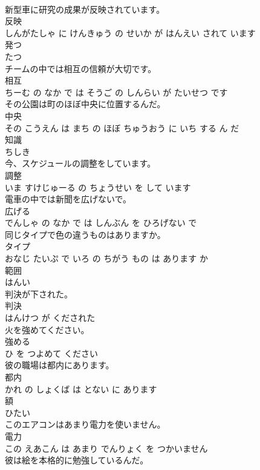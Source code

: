 \documentclass[8pt]{extreport}
\begin{document}
\begin{CJK}{UTF8}{min}
\\	新型車に研究の成果が反映されています。	
\\	反映 
\\	しんがたしゃ に けんきゅう の せいか が はんえい されて います			
\\	発つ	
\\	たつ			
\\	チームの中では相互の信頼が大切です。	
\\	相互 
\\	ちーむ の なか で は そうご の しんらい が たいせつ です			
\\	その公園は町のほぼ中央に位置するんだ。	
\\	中央 
\\	その こうえん は まち の ほぼ ちゅうおう に いち する ん だ			
\\	知識	
\\	ちしき			
\\	今、スケジュールの調整をしています。	
\\	調整 
\\	いま すけじゅーる の ちょうせい を して います			
\\	電車の中では新聞を広げないで。	
\\	広げる 
\\	でんしゃ の なか で は しんぶん を ひろげない で			
\\	同じタイプで色の違うものはありますか。	
\\	タイプ 
\\	おなじ たいぷ で いろ の ちがう もの は あります か			
\\	範囲	
\\	はんい			
\\	判決が下された。	
\\	判決 
\\	はんけつ が くだされた			
\\	火を強めてください。	
\\	強める 
\\	ひ を つよめて ください			
\\	彼の職場は都内にあります。	
\\	都内 
\\	かれ の しょくば は とない に あります			
\\	額	
\\	ひたい			
\\	このエアコンはあまり電力を使いません。	
\\	電力 
\\	この えあこん は あまり でんりょく を つかいません			
\\	彼は絵を本格的に勉強しているんだ。	

\end{CJK}
\end{document}
